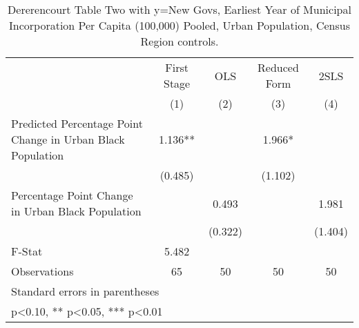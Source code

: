 \begin{table}[htbp]\centering
\def\sym#1{\ifmmode^{#1}\else\(^{#1}\)\fi}
\caption{Dererencourt Table Two with y=New Govs, Earliest Year of Municipal Incorporation Per Capita (100,000) Pooled, Urban Population, Census Region controls.}
\begin{tabular}{l*{4}{c}}
\toprule
                    & First Stage   &         OLS   &Reduced Form   &        2SLS   \\
                    &\multicolumn{1}{c}{(1)}   &\multicolumn{1}{c}{(2)}   &\multicolumn{1}{c}{(3)}   &\multicolumn{1}{c}{(4)}   \\
\midrule
Predicted Percentage Point Change in Urban Black Population&       1.136** &               &       1.966*  &               \\
                    &     (0.485)   &               &     (1.102)   &               \\
\addlinespace
Percentage Point Change in Urban Black Population&               &       0.493   &               &       1.981   \\
                    &               &     (0.322)   &               &     (1.404)   \\
\midrule
F-Stat              &       5.482   &               &               &               \\
Observations        &          65   &          50   &          50   &          50   \\
\bottomrule
\multicolumn{5}{l}{\footnotesize Standard errors in parentheses}\\
\multicolumn{5}{l}{\footnotesize * p<0.10, ** p<0.05, *** p<0.01}\\
\end{tabular}
\end{table}
